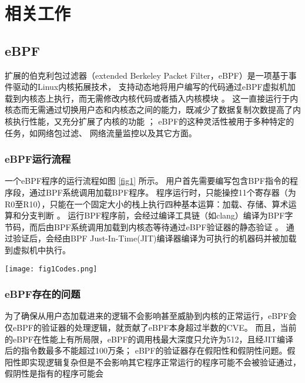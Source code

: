 \section{相关工作}
\label{section:relatedWork}
\subsection{eBPF}
扩展的伯克利包过滤器（extended Berkeley Packet Filter，eBPF）是一项基于事件驱动的Linux内核拓展技术，
支持动态地将用户编写的代码通过eBPF虚拟机加载到内核态上执行，而无需修改内核代码或者插入内核模块
\cite{sunFindingCorrectnessBugs2024, YIHeCrossContainer, riceLearningEBPFProgramming2023}。
这一直接运行于内核态而无需通过切换用户态和内核态之间的能力，既减少了数据复制次数提高了内核执行性能，又充分扩展了内核的功能
\cite{YIHeCrossContainer, ZhangZiJunLinuxXiTonge}；
eBPF的这种灵活性被用于多种特定的任务\cite{HaoValidating}，如网络包过滤\cite{10.1145/3371038, TCPdump}、
网络流量监控\cite{9110434}以及其它方面\cite{280870, 258973}。

\subsubsection{eBPF运行流程}
一个eBPF程序的运行流程如图 \ref{fig1} 所示。
用户首先需要编写包含BPF指令的程序段，通过BPF系统调用加载BPF程序。
程序运行时，只能操控11个寄存器（为R0至R10），只能在一个固定大小的栈上执行四种基本运算：加载、存储、算术运算和分支判断
\cite{HaoValidating}。\nolinebreak
运行BPF程序前，会经过编译工具链（如clang）编译为BPF字节码，而后由BPF系统调用加载到内核态等待通过eBPF验证器的静态验证
\cite{zhengBpftimeUserspaceEBPF2023}。\nolinebreak
通过验证后，会经由BPF Just-In-Time(JIT)编译器编译为可执行的机器码并被加载到虚拟机中执行。

\begin{center}
\begin{figure*}[t] 
    \texttt{[image: fig1Codes.png]}
    \caption{wasm对应的人类可读表示wat示意图}
    \label{fig1}
\end{figure*}
\end{center}

\subsubsection{eBPF存在的问题}
为了确保从用户态加载进来的逻辑不会影响甚至威胁到内核的正常运行，eBPF会
仅eBPF的验证器的处理逻辑，就贡献了eBPF本身超过半数的CVE\cite{hive}。
而且，当前的eBPF在性能上有所局限，eBPF的调用栈最大深度只允许为512，且经JIT编译后的指令数最多不能超过100万条；
eBPF的验证器存在假阳性\cite{hive}和假阴性问题。假阳性即实现逻辑复杂但是不会影响其它程序正常运行的程序可能不会被验证通过，
假阴性是指有的程序可能会

